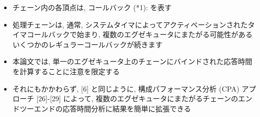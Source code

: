 \begin{frame}{}
    \begin{itemize}
        \item チェーン内の各頂点は, コールバック (*1): を表す
        \item 処理チェーンは, 通常, システムタイマによってアクティベーションされたタイマコールバックで始まり, 複数のエグゼキュータにまたがる可能性があるいくつかのレギュラーコールバックが続きます
        \item 本論文では, 単一のエグゼキュータ上のチェーンにバインドされた応答時間を計算することに注意を限定する
        \item それにもかかわらず, [6] と同じように, 構成パフォーマンス分析 (CPA) アプローチ [26]-[29] によって, 複数のエグゼキュータにまたがるチェーンのエンドツーエンドの応答時間分析に結果を簡単に拡張できる
    \end{itemize}
\end{frame}
